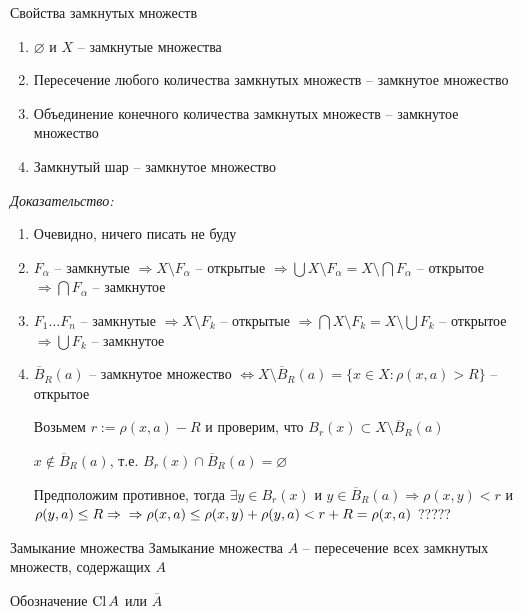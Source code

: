 \documentclass[12pt]{article}
\begin{document}
\begin{theo}{Свойства замкнутых множеств}
    \begin{enumerate}
        \item $\varnothing$ и $X$ -- замкнутые множества
        \item Пересечение любого количества замкнутых множеств -- замкнутое множество
        \item Объединение конечного количества замкнутых множеств -- замкнутое множество
        \item Замкнутый шар -- замкнутое множество
    \end{enumerate}
\end{theo}

\textit{Доказательство:}

\begin{enumerate}
    \item Очевидно, ничего писать не буду
    \item $F_\alpha$ -- замкнутые $\Rightarrow X \setminus F_\alpha$ -- открытые $\Rightarrow \bigcup X \setminus F_\alpha = X \setminus \bigcap F_\alpha$ -- открытое $\Rightarrow \bigcap F_\alpha$ -- замкнутое
    \item $F_1 \ldots F_n$ -- замкнутые $\Rightarrow X \setminus F_k$ -- открытые $\Rightarrow \bigcap X \setminus F_k = X \setminus \bigcup F_k$ -- открытое $\Rightarrow \bigcup F_k$ -- замкнутое
    \item $\overline{B}_R(a)$ -- замкнутое множество $\Leftrightarrow X \setminus \overline{B}_R(a) = \{x \in X : \rho(x, a) > R\}$ -- открытое
    
    Возьмем $r := \rho(x, a) - R$ и проверим, что $B_r(x) \subset X \setminus \overline{B}_R(a)$

    $x \notin \overline{B}_R(a)$, т.е. $B_r(x) \cap \overline{B}_R(a) = \varnothing$

    Предположим противное, тогда $\exists y \in B_r(x)$ и $y \in \overline{B}_R(a) \Rightarrow \rho(x, y) < r$ и $\rho(y, a) \leq R \Rightarrow \\ \Rightarrow \rho(x, a) \leq \rho(x, y) + \rho(y, a) < r + R = \rho(x, a)$ ?????
\end{enumerate}

\begin{defin}{Замыкание множества}
    Замыкание множества $A$ -- пересечение всех замкнутых множеств, содержащих $A$

    Обозначение $\operatorname{Cl} A$ или $\overline{A}$
\end{defin}
\end{document}

